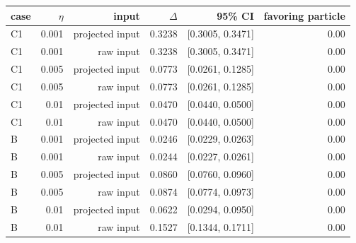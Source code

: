\begin{tabular}{lrrrrr}
\toprule
case & $\eta$ & input & $\Delta$ & 95\% CI & favoring particle \\
\midrule
C1 & 0.001 & projected input & 0.3238 & [0.3005, 0.3471] & 0.00 \\
C1 & 0.001 & raw input & 0.3238 & [0.3005, 0.3471] & 0.00 \\
C1 & 0.005 & projected input & 0.0773 & [0.0261, 0.1285] & 0.00 \\
C1 & 0.005 & raw input & 0.0773 & [0.0261, 0.1285] & 0.00 \\
C1 & 0.01 & projected input & 0.0470 & [0.0440, 0.0500] & 0.00 \\
C1 & 0.01 & raw input & 0.0470 & [0.0440, 0.0500] & 0.00 \\
B & 0.001 & projected input & 0.0246 & [0.0229, 0.0263] & 0.00 \\
B & 0.001 & raw input & 0.0244 & [0.0227, 0.0261] & 0.00 \\
B & 0.005 & projected input & 0.0860 & [0.0760, 0.0960] & 0.00 \\
B & 0.005 & raw input & 0.0874 & [0.0774, 0.0973] & 0.00 \\
B & 0.01 & projected input & 0.0622 & [0.0294, 0.0950] & 0.00 \\
B & 0.01 & raw input & 0.1527 & [0.1344, 0.1711] & 0.00 \\
\bottomrule
\end{tabular}
